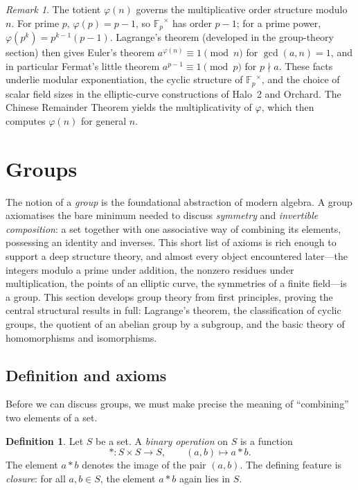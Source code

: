 \documentclass[11pt,a4paper]{article}
\theoremstyle{definition}
\newtheorem{definition}[theorem]{Definition}
\theoremstyle{remark}
\newtheorem{remark}[theorem]{Remark}
\newcommand{\Fp}{\ensuremath{\mathbb{F}_{p}}}
\begin{document}
\begin{remark}\label{intmod:rem:totientcrypto}
The totient \(\varphi(n)\) governs the multiplicative order structure modulo \(n\). For prime \(p\), \(\varphi(p)=p-1\), so \(\Fp^\times\) has order \(p-1\); for a prime power, \(\varphi(p^k)=p^{k-1}(p-1)\). Lagrange's theorem (developed in the group-theory section) then gives Euler's theorem \(a^{\varphi(n)}\equiv 1\pmod n\) for \(\gcd(a,n)=1\), and in particular Fermat's little theorem \(a^{p-1}\equiv 1\pmod p\) for \(p\nmid a\). These facts underlie modular exponentiation, the cyclic structure of \(\Fp^\times\), and the choice of scalar field sizes in the elliptic-curve constructions of Halo~2 and Orchard. The Chinese Remainder Theorem yields the multiplicativity of \(\varphi\), which then computes \(\varphi(n)\) for general \(n\).
\end{remark}

\section{Groups}\label{sec:groups}

The notion of a \emph{group} is the foundational abstraction of modern algebra. A group axiomatises the bare minimum needed to discuss \emph{symmetry} and \emph{invertible composition}: a set together with one associative way of combining its elements, possessing an identity and inverses. This short list of axioms is rich enough to support a deep structure theory, and almost every object encountered later---the integers modulo a prime under addition, the nonzero residues under multiplication, the points of an elliptic curve, the symmetries of a finite field---is a group. This section develops group theory from first principles, proving the central structural results in full: Lagrange's theorem, the classification of cyclic groups, the quotient of an abelian group by a subgroup, and the basic theory of homomorphisms and isomorphisms.

\subsection{Definition and axioms}

Before we can discuss groups, we must make precise the meaning of ``combining'' two elements of a set.

\begin{definition}\label{groups:def-binop}
Let \(S\) be a set. A \emph{binary operation} on \(S\) is a function
\[
\ast \colon S \times S \to S, \qquad (a,b) \mapsto a \ast b .
\]
The element \(a \ast b\) denotes the image of the pair \((a,b)\). The defining feature is \emph{closure}: for all \(a,b \in S\), the element \(a \ast b\) again lies in \(S\).
\end{definition}
\end{document}
